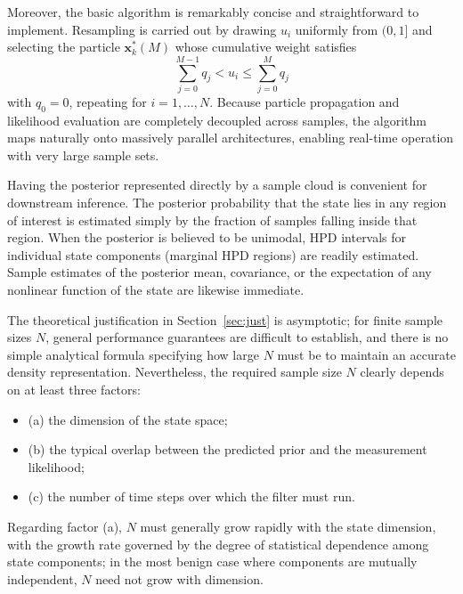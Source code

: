 Moreover, the basic algorithm is remarkably concise and straightforward to implement. Resampling is carried out by drawing $u_i$ uniformly from $(0, 1]$ and selecting the particle $\bm{x}_k^*(M)$ whose cumulative weight satisfies
\begin{equation*}
\sum_{j=0}^{M-1} q_j < u_i \le \sum_{j=0}^{M} q_j
\end{equation*}
with $q_0 = 0$, repeating for $i = 1, \dots, N$. Because particle propagation and likelihood evaluation are completely decoupled across samples, the algorithm maps naturally onto massively parallel architectures, enabling real-time operation with very large sample sets.

Having the posterior represented directly by a sample cloud is convenient for downstream inference. The posterior probability that the state lies in any region of interest is estimated simply by the fraction of samples falling inside that region. When the posterior is believed to be unimodal, HPD intervals for individual state components (marginal HPD regions) are readily estimated. Sample estimates of the posterior mean, covariance, or the expectation of any nonlinear function of the state are likewise immediate.

The theoretical justification in Section~\ref{sec:just} is asymptotic; for finite sample sizes $N$, general performance guarantees are difficult to establish, and there is no simple analytical formula specifying how large $N$ must be to maintain an accurate density representation. Nevertheless, the required sample size $N$ clearly depends on at least three factors:

\begin{itemize}
\item (a) the dimension of the state space;
\item (b) the typical overlap between the predicted prior and the measurement likelihood;
\item (c) the number of time steps over which the filter must run.
\end{itemize}

Regarding factor (a), $N$ must generally grow rapidly with the state dimension, with the growth rate governed by the degree of statistical dependence among state components; in the most benign case where components are mutually independent, $N$ need not grow with dimension.

